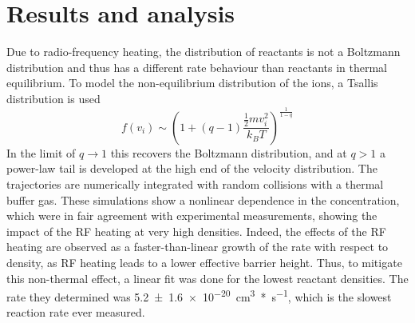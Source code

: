 \documentclass[12pt]{article}
\begin{document}
\section{Results and analysis}
Due to radio-frequency heating, the distribution of reactants is not a Boltzmann distribution and thus has a different rate behaviour than reactants in thermal equilibrium. To model the non-equilibrium distribution of the ions, a Tsallis distribution is used
\begin{equation}
    f(v_i)\sim \left(1+(q-1)\frac{\frac{1}{2}mv_i^2}{k_BT}\right)^{\frac{1}{1-q}}
\end{equation}
In the limit of \(q\to 1\) this recovers the Boltzmann distribution, and at \(q>1\) a power-law tail is developed at the high end of the velocity distribution. The trajectories are numerically integrated with random collisions with a thermal buffer gas. These simulations show a nonlinear dependence in the \ce{[H2]} concentration, which were in fair agreement with experimental measurements, showing the impact of the RF heating at very high densities. Indeed, the effects of the RF heating are observed as a faster-than-linear growth of the rate with respect to density, as RF heating leads to a lower effective barrier height. Thus, to mitigate this non-thermal effect, a linear fit was done for the lowest reactant densities. \@ The rate they determined was \SI{5.2(16)e-20}{cm^3*s^{-1}}, which is the slowest reaction rate ever measured.

\appendix{}
\end{document}
